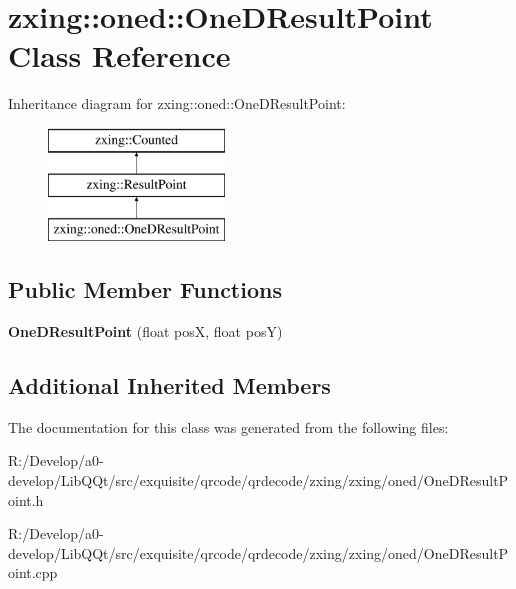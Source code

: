 \hypertarget{classzxing_1_1oned_1_1_one_d_result_point}{}\section{zxing\+:\+:oned\+:\+:One\+D\+Result\+Point Class Reference}
\label{classzxing_1_1oned_1_1_one_d_result_point}
Inheritance diagram for zxing\+:\+:oned\+:\+:One\+D\+Result\+Point\+:\begin{figure}[H]
\begin{center}
\leavevmode
\includegraphics[height=3.000000cm]{classzxing_1_1oned_1_1_one_d_result_point}
\end{center}
\end{figure}
\subsection*{Public Member Functions}
\begin{DoxyCompactItemize}
\item 
\mbox{\label{classzxing_1_1oned_1_1_one_d_result_point_a6afc55e6620efe6d1c238c8b927d2b79}} 
{\bfseries One\+D\+Result\+Point} (float posX, float posY)
\end{DoxyCompactItemize}
\subsection*{Additional Inherited Members}


The documentation for this class was generated from the following files\+:\begin{DoxyCompactItemize}
\item 
R\+:/\+Develop/a0-\/develop/\+Lib\+Q\+Qt/src/exquisite/qrcode/qrdecode/zxing/zxing/oned/One\+D\+Result\+Point.\+h\item 
R\+:/\+Develop/a0-\/develop/\+Lib\+Q\+Qt/src/exquisite/qrcode/qrdecode/zxing/zxing/oned/One\+D\+Result\+Point.\+cpp\end{DoxyCompactItemize}
